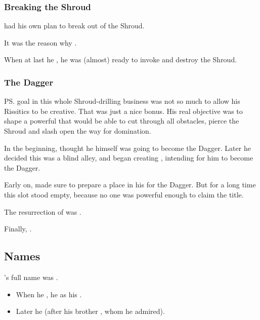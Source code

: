 \subsubsection{Breaking the Shroud}
\Secherdamon{} had his own plan to break out of the Shroud. 

It was the reason why . 

When at last he , he was (almost) ready to invoke  and destroy the Shroud. 





\subsubsection{The Dagger}
%
\ps{\Secherdamon} goal in this whole Shroud-drilling business was not so much to allow his Rissitics to be creative. 
That was just a nice bonus.
His real objective was to shape a powerful \vertex{} that would be able to cut through all obstacles, pierce the Shroud and slash open the way for \xsic{} domination. 

In the beginning, \Secherdamon{} thought he himself was going to become the Dagger. 
Later he decided this was a blind alley, and began creating \Vizsherioch, intending for him to become the Dagger. 

Early on, \Secherdamon{} made sure to prepare a place in his \matrix{} for the Dagger. 
But for a long time this slot stood empty, because no one was powerful enough to claim the title. 

The resurrection of \Nithdornazsh{} was . 

Finally, . 









\subsection{Names}
\Secherdamon's full name was \Irocas \Veldraxx \Nexagglachel \Secherdamon. 

\begin{itemize}
  \item 
    When he , he  as his . 
    
  \item 
    Later he  (after his brother , whom he admired). 
\end{itemize}








